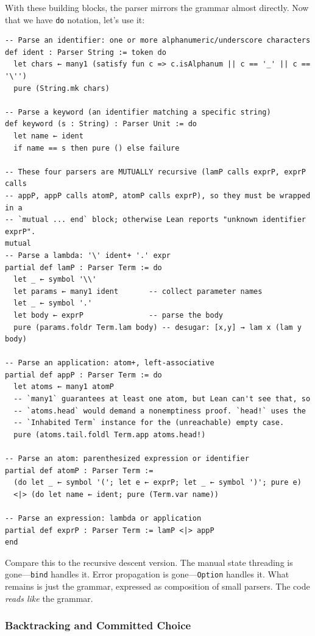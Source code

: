 \documentclass[11pt,a4paper]{article}
\theoremstyle{definition}
\begin{document}
With these building blocks, the parser mirrors the grammar almost directly.
Now that we have \texttt{do} notation, let's use it:

\begin{verbatim}
-- Parse an identifier: one or more alphanumeric/underscore characters
def ident : Parser String := token do
  let chars ← many1 (satisfy fun c => c.isAlphanum || c == '_' || c == '\'')
  pure (String.mk chars)

-- Parse a keyword (an identifier matching a specific string)
def keyword (s : String) : Parser Unit := do
  let name ← ident
  if name == s then pure () else failure

-- These four parsers are MUTUALLY recursive (lamP calls exprP, exprP calls
-- appP, appP calls atomP, atomP calls exprP), so they must be wrapped in a
-- `mutual ... end` block; otherwise Lean reports "unknown identifier exprP".
mutual
-- Parse a lambda: '\' ident+ '.' expr
partial def lamP : Parser Term := do
  let _ ← symbol '\\'
  let params ← many1 ident       -- collect parameter names
  let _ ← symbol '.'
  let body ← exprP               -- parse the body
  pure (params.foldr Term.lam body) -- desugar: [x,y] → lam x (lam y body)

-- Parse an application: atom+, left-associative
partial def appP : Parser Term := do
  let atoms ← many1 atomP
  -- `many1` guarantees at least one atom, but Lean can't see that, so
  -- `atoms.head` would demand a nonemptiness proof. `head!` uses the
  -- `Inhabited Term` instance for the (unreachable) empty case.
  pure (atoms.tail.foldl Term.app atoms.head!)

-- Parse an atom: parenthesized expression or identifier
partial def atomP : Parser Term :=
  (do let _ ← symbol '('; let e ← exprP; let _ ← symbol ')'; pure e)
  <|> (do let name ← ident; pure (Term.var name))

-- Parse an expression: lambda or application
partial def exprP : Parser Term := lamP <|> appP
end
\end{verbatim}

Compare this to the recursive descent version. The manual state threading is
gone---\texttt{bind} handles it. Error propagation is gone---\texttt{Option}
handles it. What remains is just the grammar, expressed as composition of small
parsers. The code \emph{reads like} the grammar.

\subsubsection{Backtracking and Committed Choice}
\end{document}
